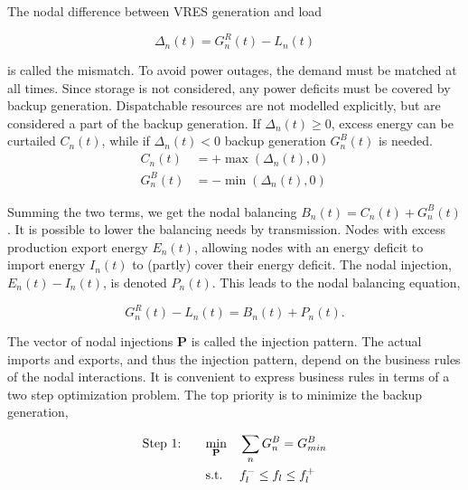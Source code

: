 \documentclass[a4paper, 5p, sort&compress]{elsarticle}%
\newcommand{\paren}[1]{\left(#1\right)}
\begin{document}
The nodal difference between VRES generation and load

\begin{equation}
  \Delta_{n}(t) = G^{R}_{n}(t) - L_{n}(t)
\end{equation}

is called the mismatch. To avoid power outages, the demand must be
matched at all times. Since storage is not considered, any power
deficits must be covered by backup generation. Dispatchable
resources are not modelled explicitly, but are considered a part of
the backup generation. If $\Delta_{n}(t) \geq 0$, excess energy can be
curtailed $C_{n}(t)$, while if $\Delta_{n}(t) < 0$ backup generation
$G^{B}_{n}(t)$ is needed.
\begin{align}
  C_{n}(t) &= + \max \paren{\Delta_{n}(t),0} \\
  G^{B}_{n}(t) &= - \min \phantom{} \paren{\Delta_{n}(t),0} 
\end{align}

Summing the two terms, we get the nodal balancing
$B_{n}(t) = C_{n}(t) + G^{B}_{n}(t)$.  It is possible to lower the
balancing needs by transmission. Nodes with excess production export
energy $E_{n}(t)$, allowing nodes with an energy deficit to import
energy $I_{n}(t)$ to (partly) cover their energy deficit. The nodal
injection, $E_{n}(t) - I_{n}(t)$, is denoted $P_{n}(t)$. This leads to
the nodal balancing equation,

\begin{equation}
  \label{eq:nodal-balancing}
  G^{R}_{n}(t) - L_{n}(t) = B_{n}(t) + P_{n}(t) .
\end{equation}

The vector of nodal injections $\mathbf{P}$ is called the injection
pattern. The actual imports and exports, and thus the injection
pattern, depend on the business rules of the nodal interactions. It is
convenient to express business rules in terms of a two step
optimization problem. The top priority is to minimize the backup
generation,

\begin{equation}
  \label{eq:step1}
  \begin{aligned}
    \text{Step 1: \hspace{15pt}}& \underset{\mathbf{P}}{\text{min}}
    & & \sum_{n} G_{n}^{B} = G^{B}_{min} \\
    & \text{s.t.}
    & & f_{l}^{-} \leq f_{l} \leq f_{l}^{+}
  \end{aligned}
\end{equation}
\end{document}
